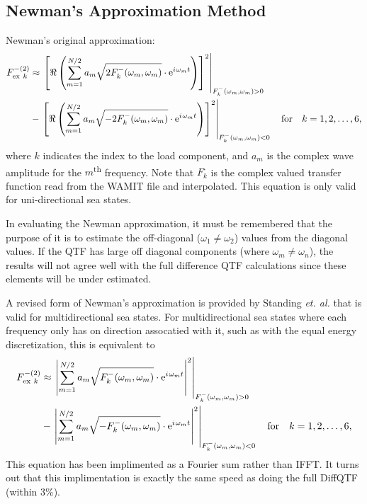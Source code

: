 \clearpage
\subsection{Newman's Approximation Method}
\label{sec:2ndOrdCalc:Diff:Newman}

Newman's original approximation:
\begin{align}
   {F_{\text{ex}~k}^{- (2)}} &\approx 
            \left.   \left[ \Re \left( \sum\limits_{m=1}^{N/2}
                     {a_m} \sqrt{   2 F_k^{-}(\omega_m,\omega_m)}
                     \cdot \mathrm{e}^{{i\mkern1.5mu} \omega_m t} \right) \right]^2 \right|_{F_{k}^{-}(\omega_m,\omega_m) > 0} \nonumber\\
         &-  \left.   \left[ \Re \left( \sum\limits_{m=1}^{N/2}
                     {a_m} \sqrt{  -2 F_k^{-}(\omega_m,\omega_m)}
                     \cdot \mathrm{e}^{{i\mkern1.5mu} \omega_m t} \right) \right]^2 \right|_{F_{k}^{-}(\omega_m,\omega_m) < 0}
      \quad\text{for}\quad k=1,2,\ldots,6,
\label{eq:Newman}
\end{align}
where $k$ indicates the index to the load component, and $a_m$ is the complex wave amplitude for the $m$\textsuperscript{th} frequency.
Note that $F_k^\text{-}$ is the complex valued transfer function read from the WAMIT file and interpolated.  This equation is only valid for uni-directional sea states.

In evaluating the Newman approximation, it must be remembered that the purpose of it is to estimate the off-diagonal ($\omega_1 \ne \omega_2$) values from the diagonal values. If the QTF has large off diagonal components (where $\omega_m \ne \omega_n$), the results will not agree well with the full difference QTF calculations since these elements will be under estimated.

A revised form of Newman's approximation is provided by Standing \emph{et. al.} that is valid for multidirectional sea states.  For multidirectional sea states where each frequency only has on direction assocatied with it, such as with the equal energy discretization, this is equivalent to
\begin{align}
   {F_{\text{ex}~k}^{- (2)}} &\approx 
            \left.   \left| \sum\limits_{m=1}^{N/2}
                     {a_m} \sqrt{   F_k^{-}(\omega_m,\omega_m)}
                     \cdot \mathrm{e}^{{i\mkern1.5mu} \omega_m t} \right|^2 \right|_{F_{k}^{-}(\omega_m,\omega_m) > 0} \nonumber\\
         &-  \left.   \left| \sum\limits_{m=1}^{N/2}
                     {a_m} \sqrt{  -F_k^{-}(\omega_m,\omega_m)}
                     \cdot \mathrm{e}^{{i\mkern1.5mu} \omega_m t} \right|^2 \right|_{F_{k}^{-}(\omega_m,\omega_m) < 0}
      \quad\text{for}\quad k=1,2,\ldots,6,
\label{eq:NewmanRevised}
\end{align}
This equation has been implimented as a Fourier sum rather than IFFT.  It turns out that this implimentation is exactly the same speed as doing the full DiffQTF (within 3\%).


